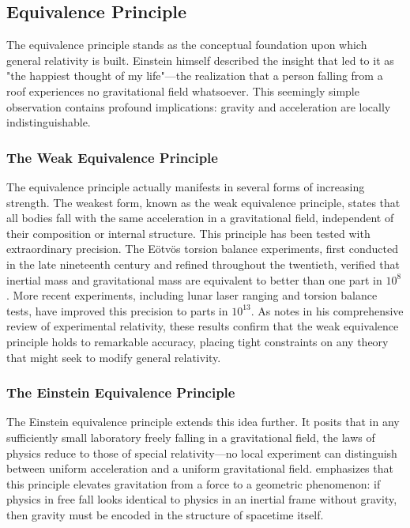 \documentclass[12pt, a4paper]{article}
\begin{document}
	
	\subsection{Equivalence Principle}
	The equivalence principle stands as the conceptual foundation upon which general relativity is built. Einstein himself described the insight that led to it as "the happiest thought of my life"---the realization that a person falling from a roof experiences no gravitational field whatsoever. This seemingly simple observation contains profound implications: gravity and acceleration are locally indistinguishable.
	
	\subsubsection{The Weak Equivalence Principle}
	The equivalence principle actually manifests in several forms of increasing strength. The weakest form, known as the weak equivalence principle, states that all bodies fall with the same acceleration in a gravitational field, independent of their composition or internal structure. This principle has been tested with extraordinary precision. The Eötvös torsion balance experiments, first conducted in the late nineteenth century and refined throughout the twentieth, verified that inertial mass and gravitational mass are equivalent to better than one part in \(10^8\) \citep{lakyTestMeasurementsEotvos2009}. More recent experiments, including lunar laser ranging and torsion balance tests, have improved this precision to parts in \(10^{13}\). As \citep{willConfrontationGeneralRelativity2014} notes in his comprehensive review of experimental relativity, these results confirm that the weak equivalence principle holds to remarkable accuracy, placing tight constraints on any theory that might seek to modify general relativity.
	
	\subsubsection{The Einstein Equivalence Principle}
	The Einstein equivalence principle extends this idea further. It posits that in any sufficiently small laboratory freely falling in a gravitational field, the laws of physics reduce to those of special relativity—no local experiment can distinguish between uniform acceleration and a uniform gravitational field. \citep{willConfrontationGeneralRelativity2014} emphasizes that this principle elevates gravitation from a force to a geometric phenomenon: if physics in free fall looks identical to physics in an inertial frame without gravity, then gravity must be encoded in the structure of spacetime itself.
	
\end{document}
